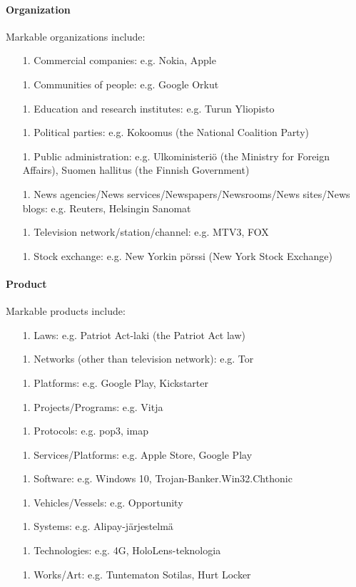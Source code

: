 \documentclass[11pt]{article}
\begin{document}
\paragraph{Organization}

Markable organizations include:

\begin{itemize}

\item[1.] Commercial companies: e.g. Nokia, Apple
\item[1.] Communities of people: e.g. Google Orkut
\item[1.] Education and research institutes: e.g. Turun Yliopisto
\item[1.] Political parties: e.g. Kokoomus (the National Coalition Party)
\item[1.] Public administration: e.g. Ulkoministeri\"o (the Ministry for Foreign Affairs), Suomen hallitus (the Finnish Government)
\item[1.] News agencies/News services/Newspapers/Newsrooms/News sites/News blogs: e.g. Reuters, Helsingin Sanomat
\item[1.] Television network/station/channel: e.g. MTV3, FOX
\item[1.] Stock exchange: e.g. New Yorkin p\"orssi (New York Stock Exchange)

\end{itemize}


\paragraph{Product}

Markable products include:

\begin{itemize}

\item[1.] Laws: e.g. Patriot Act-laki (the Patriot Act law)
\item[1.] Networks (other than television network): e.g. Tor
\item[1.] Platforms: e.g. Google Play, Kickstarter
\item[1.] Projects/Programs: e.g. Vitja
\item[1.] Protocols: e.g. pop3, imap
\item[1.] Services/Platforms: e.g. Apple Store, Google Play
\item[1.] Software: e.g. Windows 10, Trojan-Banker.Win32.Chthonic
\item[1.] Vehicles/Vessels: e.g. Opportunity
\item[1.] Systems: e.g. Alipay-j\"arjestelm\"a
\item[1.] Technologies: e.g. 4G, HoloLens-teknologia
\item[1.] Works/Art: e.g. Tuntematon Sotilas, Hurt Locker
 
\end{itemize}
\end{document}
